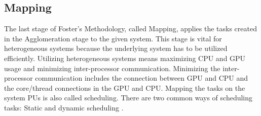  

\subsection{Mapping}
The last stage of Foster's Methodology, called Mapping, applies the tasks created in the Agglomeration stage to the given system. This stage is vital for heterogeneous systems because the underlying system has to be utilized efficiently. Utilizing heterogeneous systems means maximizing CPU and GPU usage and minimizing inter-processor communication. Minimizing the inter-processor communication includes the connection between GPU and CPU and the core/thread connections in the GPU and CPU.
Mapping the tasks on the system PUs is also called scheduling. There are two common ways of scheduling tasks: Static and dynamic scheduling \cite{kopetzRealTimeScheduling1997}.

